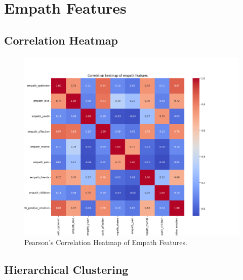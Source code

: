 

\section{Empath Features}

\subsection*{Correlation Heatmap}
\label{sec:correlationheatmapsspotifyfeatures}

\begin{center}
\begin{figure}[H]
  \centering
  \includegraphics[width=6in]{img/corr_heatmap_empath.png}
  \caption{Pearson's Correlation Heatmap of Empath Features.}
  \label{Figure:fig_beh}
\end{figure}
\end{center}

\subsection*{Hierarchical Clustering}
\label{sec:hierarchicalclustering}

